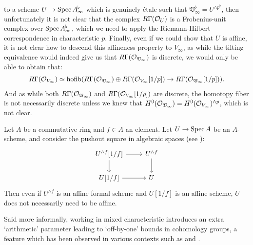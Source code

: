to a scheme $U \to \spec{A_{\infty}^{\flat}}$ which is genuinely \'{e}tale such that $\mathfrak{V}_{\infty}^{\flat} = U^{\wedge p^{\flat}}$,
then unfortunately it is not clear that the complex $R\Gamma(\cal{O}_U)$ is a Frobenius-unit complex over $\spec{A_{\infty}^{\flat}}$, 
which we need to apply the Riemann-Hilbert correspondence in characteristic $p$. 
Finally, even if we could show that $U$ is affine, it is not clear how to descend this affineness property to $V_{\infty}$, as while the tilting equivalence would indeed
give us that $R\Gamma(\cal{O}_{\mathfrak{V}_{\infty}})$ is discrete, we would only be able to obtain that:
\[R\Gamma(\cal{O}_{V_{\infty}}) \simeq \hofib(R\Gamma(\cal{O}_{\mathfrak{V}_{\infty}}) \oplus R\Gamma(\cal{O}_{V_{\infty}}[1/p]) \to R\Gamma(\cal{O}_{\mathfrak{V}_{\infty}}[1/p])).\] 
And as while both $R\Gamma(\cal{O}_{\mathfrak{V}_{\infty}})$ and $R\Gamma(\cal{O}_{V_{\infty}}[1/p])$ are discrete, the homotopy fiber is not necessarily discrete 
unless we knew that $H^0(\cal{O}_{\mathfrak{V}_{\infty}}) = H^0(\cal{O}_{V_{\infty}})^{\wedge p}$, which is not clear. 
\begin{warning}
Let $A$ be a commutative ring and $f\in A$ an element. Let $U \to \spec{A}$ be an $A$-scheme, and consider the pushout square in algebraic spaces (see \cite[Theorem 1.4]{bhattalg}):
\[\begin{tikzcd}U^{\wedge f}[1/f] \arrow[r] \arrow[d] & U^{\wedge f} \arrow[d]\\
U[1/f] \arrow[r] & U
\end{tikzcd}\]
Then even if $U^{\wedge f}$ is an affine formal scheme and $U[1/f]$ is an affine scheme, $U$ does not necessarily need to be affine.
\end{warning}
\indent Said more informally, working in mixed characteristic introduces an extra `arithmetic' parameter leading to `off-by-one' bounds in cohomology groups, 
a feature which has been observed in various contexts such as \cite{bhattcohen} and \cite{purflat}.\\

